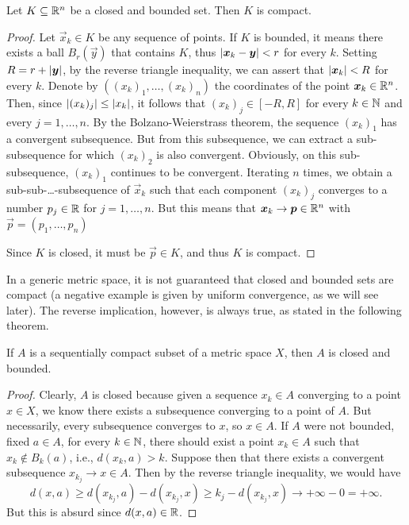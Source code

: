 \begin{theorem}[compactness in $\RR^n$]%
  \label{th:compattezza_Rn}%
Let $K\subseteq {\mathbb R}^n$ be a closed and bounded set. 
Then $K$ is compact.
\end{theorem}
\begin{proof}
Let $\vec x_k\in K$ be any sequence of points. 
If $K$ is bounded, it means there exists a ball $B_r(\vec y)$ 
that contains $K$, thus ${\left|\boldsymbol x_k - \boldsymbol y\right|} < r$ for every $k$.
Setting $R=r+{\left|\boldsymbol y\right|}$, by the reverse triangle inequality, we can assert 
that ${\left|\boldsymbol x_k\right|} < R$ for every $k$. 
Denote by $((x_k)_1, \dots, (x_k)_n)$ the coordinates 
of the point $\boldsymbol x_k\in {\mathbb R}^n$. 
Then, since ${\left|(x_k)_j\right|}\le {\left|x_k\right|}$, it follows that $(x_k)_j\in [-R,R]$
for every $k\in{\mathbb N}$ and every $j=1,\dots, n$.
By the Bolzano-Weierstrass theorem, the sequence $(x_k)_1$ has a convergent
subsequence. But from this subsequence, we can extract a sub-subsequence
for which $(x_k)_2$ is also convergent. 
Obviously, on this sub-subsequence, $(x_k)_1$ continues to be convergent.
Iterating $n$ times, we obtain a sub-sub-\dots-subsequence of $\vec x_k$ 
such that each component $(x_k)_j$ converges to a number $p_j\in {\mathbb R}$
for $j=1,\dots, n$.
But this means that $\boldsymbol x_k \to \boldsymbol p \in {\mathbb R}^n$ with $\vec p = (p_1,\dots,
p_n)$

Since $K$ is closed, it must be $\vec p\in K$, and thus $K$ is compact.
\end{proof}

In a generic metric space, it is not guaranteed that closed and bounded sets 
are compact (a negative example is given by uniform convergence, as
we will see later). 
The reverse implication, however, is always true, as stated in the
following theorem.

\begin{theorem}%
\mymark{**}%
If $A$ is a sequentially compact subset of a metric space $X$,
then $A$ is closed and bounded.
\end{theorem}
%
\begin{proof}
Clearly, $A$ is closed because given a sequence $x_k\in A$ converging to a point
$x\in X$,
we know there exists a subsequence converging to a point of $A$. But
necessarily, every subsequence converges to $x$, so $x\in A$. If $A$ were not
bounded,
fixed $a\in A$, for every $k\in {\mathbb N}$, there should exist a point $x_k\in A$ such
that $x_k \not\in B_k(a)$,
i.e., $d(x_k,a) > k$. Suppose then that there exists a convergent subsequence
$x_{k_j}\to x \in A$. Then by the reverse triangle inequality, we would have
\[
  d(x, a) \ge d(x_{k_j}, a) - d(x_{k_j},x)
   \ge k_j - d(x_{k_j},x) \to +\infty - 0 = +\infty.
\]
But this is absurd since $d(x,a)\in {\mathbb R}$.
\end{proof}

